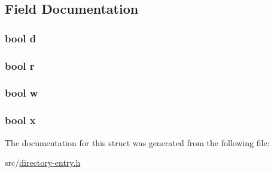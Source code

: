 \subsection{Field Documentation}
\hypertarget{structpoi__attr__t_a291ac6e121c27d3c9a71d995cf34685c}{
\subsubsection[{d}]{\setlength{\rightskip}{0pt plus 5cm}bool d}}\label{structpoi__attr__t_a291ac6e121c27d3c9a71d995cf34685c}
\hypertarget{structpoi__attr__t_a904fc9328a7095487716875e4a892851}{
\subsubsection[{r}]{\setlength{\rightskip}{0pt plus 5cm}bool r}}\label{structpoi__attr__t_a904fc9328a7095487716875e4a892851}
\hypertarget{structpoi__attr__t_ac2e5f3b10af22c39ed83be143a508b80}{
\subsubsection[{w}]{\setlength{\rightskip}{0pt plus 5cm}bool w}}\label{structpoi__attr__t_ac2e5f3b10af22c39ed83be143a508b80}
\hypertarget{structpoi__attr__t_a946a8f8377210c472c7cbdf11f154280}{
\subsubsection[{x}]{\setlength{\rightskip}{0pt plus 5cm}bool x}}\label{structpoi__attr__t_a946a8f8377210c472c7cbdf11f154280}


The documentation for this struct was generated from the following file\-:\begin{DoxyCompactItemize}
\item 
src/\hyperlink{directory-entry_8h}{directory-\/entry.\-h}\end{DoxyCompactItemize}
